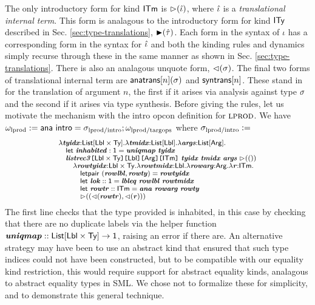 \documentclass[10pt,preprint]{sigplanconf}
\begin{document}
The only introductory form for kind ${\sf ITm}$ is ${\rhd}(\hat{\iota})$, where $\hat{\iota}$ is a \emph{translational internal term}. This form is analagous to the introductory form for kind ${\sf ITy}$ described in Sec. \ref{sec:type-translations}, ${\blacktriangleright}(\hat{\tau})$. Each form in the syntax of $\iota$ has a corresponding form in the syntax for $\hat{\iota}$ and both the kinding rules and dynamics simply recurse through these in the same manner as shown in Sec. \ref{sec:type-translations}. There is also an analagous unquote form, ${\lhd}(\sigma)$. %
The final two forms of translational internal term are ${\sf anatrans}[n](\sigma)$ and ${\sf syntrans}[n]$. These stand in for the translation of argument $n$, the first if it arises via analysis against type $\sigma$ and the second if it arises via type synthesis.  Before giving the rules, let us motivate the mechanism with the intro opcon definition for $\textsc{lprod}$. We have $\omega_\text{lprod} := {\sf ana}~{\sf intro}=\sigma_\text{lprod/intro}; \omega_\text{lprod/targops}$ where $\sigma_\text{lprod/intro} :=$\vspace{-5px}
\[\small
\begin{array}{l}
\lambda\svar{tyidx}{:}\klist{\klbl\times\kty}.\lambda\svar{tmidx}{:}\klist{\klbl}.\lambda\svar{args}{:}\kargs.\\
\quad \keyw{let}~\svar{inhabited}:\kunit=\svar{uniqmap}~\svar{tyidx}\\
\quad \skap{\kitm}{\skap{\karg}{\skap{\klbl}{\skap{\klbl\times\kty}{\svar{listrec3}}}}}~\svar{tyidx}~\svar{tmidx}~\svar{args}~\sqitm{\itriv}\\
\quad\quad \lambda \svar{rowtyidx}{:}\klbl\times\kty.\lambda \svar{rowtmidx}{:}\klbl.\lambda\svar{rowarg}{:}\karg.\lambda \svar{r}{:}\kitm.\\
\quad\quad\quad \keyw{letpair}~(\svar{rowlbl}, \svar{rowty})=\svar{rowtyidx}\\
\quad\quad\quad \keyw{let}~\svar{lok}::\kunit=\svar{lbleq}~\svar{rowlbl} ~\svar{rowtmidx}\\
\quad\quad\quad \keyw{let}~\svar{rowtr} :: \kitm = \svar{ana}~\svar{rowarg}~\svar{rowty}\\
\quad\quad\quad \sqitm{(\quq{\svar{rowtr}}, \quq{\svar{r}})
}
\end{array}
\]
The first line checks that the type provided is inhabited, in this case by checking that there are no duplicate labels via the helper function ${\textbf{\textit{uniqmap}}} :: {\sf List}[{\sf Lbl} \times {\sf Ty}]\rightarrow {\sf 1}$, raising an error if there are. An alternative strategy may have been to use an abstract kind that ensured that such type indices could not have been constructed, but to be compatible with our equality kind restriction, this would require support for abstract equality kinds, analagous to abstract equality types in SML. We chose not to formalize these for simplicity, and to demonstrate this general technique. %
\end{document}
